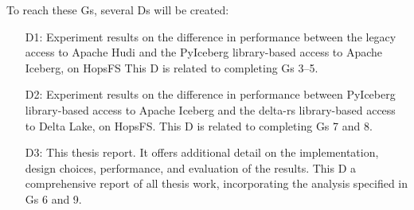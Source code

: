 To reach these \glspl{G}, several \glspl{D} will be created:
\begin{enumerate}
    \item[D1:] Experiment results on the difference in performance between the legacy access to Apache Hudi and the PyIceberg library-based access to Apache Iceberg, on \gls{HopsFS}
    This \gls{D} is related to completing \glspl{G} 3--5.
    \item[D2:] Experiment results on the difference in performance between PyIceberg library-based access to Apache Iceberg and the delta-rs library-based access to Delta Lake, on \gls{HopsFS}.
    This \gls{D} is related to completing \glspl{G} 7 and 8.
    \item[D3:] This thesis report. It offers additional detail on the implementation, design choices, performance, and evaluation of the results.
    This \gls{D} a comprehensive report of all thesis work, incorporating the analysis specified in \glspl{G} 6 and 9.
\end{enumerate}